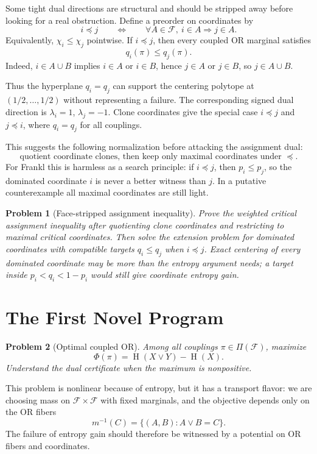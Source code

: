 \documentclass[11pt]{article}
\newtheorem{problem}{Problem}
\DeclareMathOperator{\Ent}{H}
\begin{document}
Some tight dual directions are structural and should be stripped away before
looking for a real obstruction.  Define a preorder on coordinates by
\[
  i\preceq j
  \qquad\Longleftrightarrow\qquad
  \forall A\in\mathcal{F},\ i\in A\Rightarrow j\in A.
\]
Equivalently, $\chi_i\leq \chi_j$ pointwise.  If $i\preceq j$, then every
coupled OR marginal satisfies
\[
  q_i(\pi)\leq q_j(\pi).
\]
Indeed, $i\in A\cup B$ implies $i\in A$ or $i\in B$, hence $j\in A$ or
$j\in B$, so $j\in A\cup B$.

Thus the hyperplane $q_i=q_j$ can support the centering polytope at
$(1/2,\dots,1/2)$ without representing a failure.  The corresponding signed
dual direction is $\lambda_i=1$, $\lambda_j=-1$.  Clone coordinates give the
special case $i\preceq j$ and $j\preceq i$, where $q_i=q_j$ for all couplings.

This suggests the following normalization before attacking the assignment
dual:
\[
  \text{quotient coordinate clones, then keep only maximal coordinates under }
  \preceq.
\]
For Frankl this is harmless as a search principle: if $i\preceq j$, then
$p_i\leq p_j$, so the dominated coordinate $i$ is never a better witness than
$j$.  In a putative counterexample all maximal coordinates are still light.

\begin{problem}[Face-stripped assignment inequality]
Prove the weighted critical assignment inequality after quotienting clone
coordinates and restricting to maximal critical coordinates.  Then solve the
extension problem for dominated coordinates with compatible targets
$q_i\leq q_j$ when $i\preceq j$.  Exact centering of every dominated
coordinate may be more than the entropy argument needs; a target inside
$p_i<q_i<1-p_i$ would still give coordinate entropy gain.
\end{problem}

\section{The First Novel Program}

\begin{problem}[Optimal coupled OR]
Among all couplings $\pi\in\Pi(\mathcal{F})$, maximize
\[
  \Phi(\pi)=\Ent(X\vee Y)-\Ent(X).
\]
Understand the dual certificate when the maximum is nonpositive.
\end{problem}

This problem is nonlinear because of entropy, but it has a transport flavor:
we are choosing mass on $\mathcal{F}\times\mathcal{F}$ with fixed marginals,
and the objective depends only on the OR fibers
\[
  m^{-1}(C)=\{(A,B): A\vee B=C\}.
\]
The failure of entropy gain should therefore be witnessed by a potential on
OR fibers and coordinates.
\end{document}
